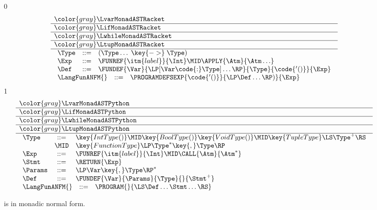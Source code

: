 \documentclass[7x10]{TimesAPriori_MIT}%
\newcommand{\gray}[1]{{\color{gray} #1}}
\def\racketEd{0}
\def\pythonEd{1}
\def\edition{0}
\numberwithin{theorem}{chapter}
\numberwithin{definition}{chapter}
\numberwithin{equation}{chapter}
\begin{document}
\newcommand{\LfunMonadASTRacket}{
  \begin{array}{lcl}
  \Type &::=& (\Type \ldots \; \key{->}\; \Type) \\
  \Exp &::=& \FUNREF{\itm{label}}{\Int} \MID \APPLY{\Atm}{\Atm\ldots}\\
  \Def &::=& \FUNDEF{\Var}{\LP[\Var \code{:} \Type]\ldots\RP}{\Type}{\code{'()}}{\Exp}
  \end{array}
}

\newcommand{\LfunMonadASTPython}{
  \begin{array}{lcl}
    \Type &::=& \key{IntType()} \MID \key{BoolType()} \key{VoidType()}
        \MID \key{TupleType}\LS\Type^+\RS\\
        &\MID& \key{FunctionType}\LP \Type^{*} \key{, } \Type \RP \\
    \Exp &::=& \FUNREF{\itm{label}}{\Int} \MID \CALL{\Atm}{\Atm^{*}}\\
    \Stmt &::=& \RETURN{\Exp} \\
   \Params &::=&  \LP\Var\key{,}\Type\RP^* \\
   \Def &::=& \FUNDEF{\Var}{\Params}{\Type}{}{\Stmt^{+}} 
  \end{array}
}

\begin{figure}[tp]
\centering
\begin{tcolorbox}[colback=white]
\small
{\if\edition\racketEd    
\[
\begin{array}{l}
  \gray{\LvarMonadASTRacket} \\ \hline
  \gray{\LifMonadASTRacket} \\ \hline
  \gray{\LwhileMonadASTRacket} \\ \hline
  \gray{\LtupMonadASTRacket} \\ \hline
  \LfunMonadASTRacket \\
\begin{array}{rcl}
\LangFunANFM{}  &::=& \PROGRAMDEFSEXP{\code{'()}}{\LP\Def\ldots\RP)}{\Exp}
\end{array}
\end{array}
\]
\fi}
{\if\edition\pythonEd
\[
\begin{array}{l}
  \gray{\LvarMonadASTPython} \\ \hline
  \gray{\LifMonadASTPython} \\ \hline
  \gray{\LwhileMonadASTPython} \\ \hline
  \gray{\LtupMonadASTPython} \\ \hline
  \LfunMonadASTPython \\
  \begin{array}{rcl}
     \LangFunANFM{} &::=& \PROGRAM{}{\LS \Def \ldots \Stmt \ldots \RS}
  \end{array}
\end{array}
\]
\fi}
\end{tcolorbox}

\caption{\LangFunANF{} is \LangFunRef{} in monadic normal form.}
\label{fig:Lfun-anf-syntax}
\end{figure}
\end{document}
